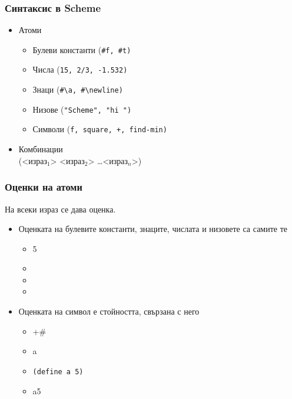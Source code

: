 \documentclass{beamer}
\begin{document}
\begin{frame}
  \frametitle{Синтаксис в Scheme}

  \begin{itemize}
  \item Атоми
    \begin{itemize}
    \item Булеви константи (\tt{\#f}, \tt{\#t})
    \item Числа (\tt{15}, \tt{2/3}, \tt{-1.532})
    \item Знаци (\tt{\#\textbackslash a}, \tt{\#\textbackslash newline})
    \item Низове (\tt{"Scheme"}, \tt{"hi "})
    \item Символи (\tt f, \tt{square}, \tt +, \tt{find-min})
    \end{itemize}
  \item Комбинации\\
    \vspace{1em}
    \alert({}<израз$_1$> <израз$_2$> \ldots <израз$_n$>\alert)
  \end{itemize}
\end{frame}

\begin{frame}[fragile]
  \frametitle{Оценки на атоми}

  На всеки израз се дава оценка.
  \begin{itemize}[<+->]
  \item Оценката на булевите константи, знаците, числата и низовете са самите те
    \begin{itemize}
    \item {} 5
    \item {}
    \item {}
    \item {}
    \end{itemize}
  \item Оценката на символ е стойността, свързана с него
    \begin{itemize}
    \item \evalsto +{\#<procedure:+>}
    \item \evalstoerr a
    \item \tt{(define a 5)}
    \item \evalsto a5
    \end{itemize}
  \end{itemize}
\end{frame}
\end{document}
